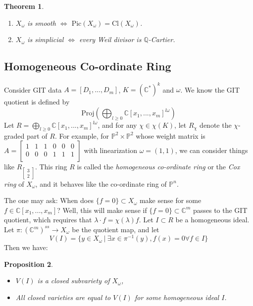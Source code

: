 \documentclass{article}
\newtheorem{theorem}{Theorem}
\newtheorem{prop}[theorem]{Proposition}
\theoremstyle{definition}
\theoremstyle{remark}
\numberwithin{theorem}{section}
\newcommand{\C}{\mathbb{C}}
\newcommand{\bP}{\mathbb{P}}
\newcommand{\Proj}{\text{Proj}}
\newcommand{\Pic}{\mathrm{Pic}}
\newcommand{\Cl}{\mathrm{Cl}}
\newenvironment{thm}{
\begin{mdframed}
	\vspace{-0.5em}
	\begin{theorem}
}{
	\end{theorem}
\end{mdframed}
}
\begin{document}
	\begin{thm}
		\begin{enumerate}
			\item $X_\omega$ is smooth $\iff$ $\Pic(X_\omega) = \Cl(X_\omega)$.
			\item $X_\omega$ is simplicial $\iff$ every Weil divisor is $\mathbb{Q}$-Cartier.
		\end{enumerate}
	\end{thm}

	\subsection{Homogeneous Co-ordinate Ring}
	Consider GIT data $A=[D_1,...,D_m]$, $K=(\C^\ast)^k$ and $\omega$. We know the GIT quotient is defined by
	$$\Proj(\bigoplus_{l \geq 0} \C[x_1,...,x_m]^{l \omega})$$
	Let $R= \bigoplus_{l \geq 0} \C[x_1,...,x_m]^{l\omega}$, and for any $\chi \in \chi(K)$, let $R_\chi$ denote the $\chi$-graded part of $R$. For example, for $\bP^2\times \bP^2$ whose weight matrix is $A=\begin{bmatrix}
		1 & 1 & 1 & 0 & 0 & 0 \\
		0 & 0 & 0 & 1 & 1 & 1 \\
	\end{bmatrix}$ with linearization $\omega = (1,1)$, we can consider things like $R_{\begin{bmatrix}3\\2\end{bmatrix}}$. This ring $R$ is called the \emph{homogeneous co-ordinate ring} or the \emph{Cox ring} of $X_\omega$, and it behaves like the co-ordinate ring of $\bP^n$. \vspace{1em}

	The one may ask: When does $\{f=0\}\subset X_\omega$ make sense for some $f\in \C[x_1,...,x_m]$? Well, this will make sense if $\{f=0\} \subset \C^m$ passes to the GIT quotient, which requires that $\lambda\cdot f = \chi(\lambda) f$. Let $I\subset R$ be a homogeneous ideal. Let $\pi:(\C^m)^{ss}\to X_\omega$ be the quotient map, and let 
	$$V(I) = \{y\in X_\omega ~|~ \exists x\in \pi^{-1}(y), f(x)=0 \forall f\in I\}$$
	Then we have:
	\begin{prop}
		\begin{itemize}
			\item $V(I)$ is a closed subvariety of $X_\omega$,
			\item All closed varieties are equal to $V(I)$ for some homogeneous ideal $I$.
		\end{itemize}
	\end{prop}
\end{document}
